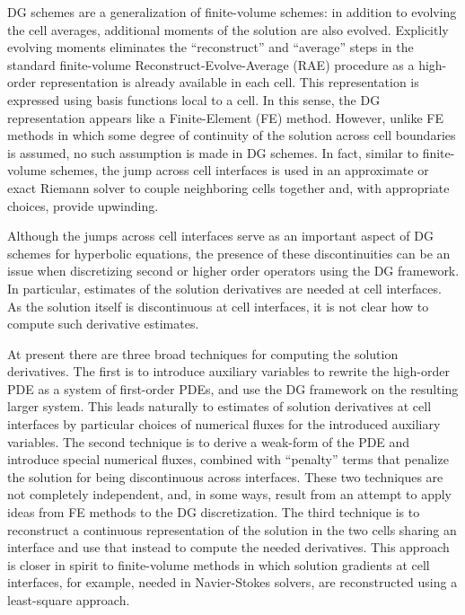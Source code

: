 \documentclass{siamltex}
\begin{document}
DG schemes are a generalization of finite-volume schemes: in addition
to evolving the cell averages, additional moments of the solution are
also evolved. Explicitly evolving moments eliminates the
``reconstruct'' and ``average'' steps in the standard finite-volume
Reconstruct-Evolve-Average (RAE) procedure\cite{leveque_book_2002} as
a high-order representation is already available in each cell. This
representation is expressed using basis functions local to a cell. In
this sense, the DG representation appears like a Finite-Element (FE)
method. However, unlike FE methods in which some degree of continuity
of the solution across cell boundaries is assumed, no such assumption
is made in DG schemes. In fact, similar to finite-volume schemes, the
jump across cell interfaces is used in an approximate or exact Riemann
solver to couple neighboring cells together and, with appropriate
choices, provide upwinding.

Although the jumps across cell interfaces serve as an important aspect
of DG schemes for hyperbolic equations, the presence of these
discontinuities can be an issue when discretizing second or higher
order operators using the DG framework. In particular, estimates of
the solution derivatives are needed at cell interfaces. As the
solution itself is discontinuous at cell interfaces, it is not clear
how to compute such derivative estimates.

At present there are three broad techniques for computing the solution
derivatives. The first is to introduce auxiliary variables to rewrite
the high-order PDE as a system of first-order PDEs, and use the DG
framework on the resulting larger system. This leads naturally to
estimates of solution derivatives at cell interfaces by particular
choices of numerical fluxes for the introduced auxiliary variables.
The second technique is to derive a weak-form of the PDE and introduce
special numerical fluxes, combined with ``penalty'' terms that
penalize the solution for being discontinuous across interfaces. These
two techniques are not completely independent, and, in some ways,
result from an attempt to apply ideas from FE methods to the DG
discretization. The third technique is to reconstruct a continuous
representation of the solution in the two cells sharing an interface
and use that instead to compute the needed derivatives. This approach
is closer in spirit to finite-volume methods in which solution
gradients at cell interfaces, for example, needed in Navier-Stokes
solvers, are reconstructed using a least-square approach.



\end{document}
